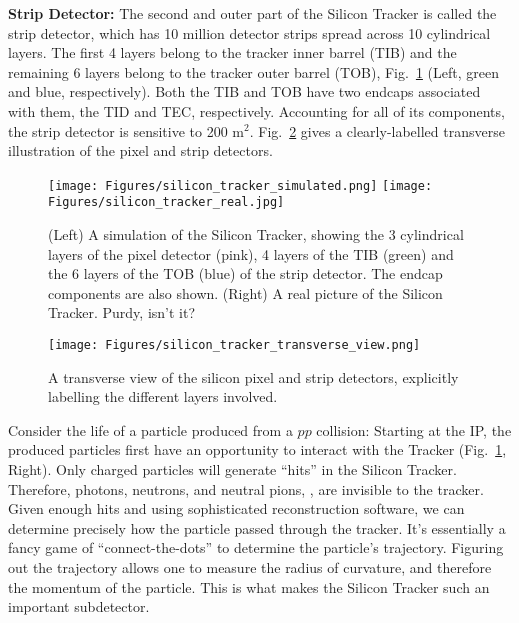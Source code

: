{\bf Strip Detector:} The second and outer part of the Silicon Tracker is called the strip detector, which has 10 million detector strips spread across 10 cylindrical layers.
The first 4 layers belong to the tracker inner barrel (TIB) and the remaining 6 layers belong to the tracker outer barrel (TOB), Fig.~\ref{fig:tracker_real} (Left, green and blue, respectively). 
Both the TIB and TOB have two endcaps associated with them, the TID and TEC, respectively.
Accounting for all of its components, the strip detector is sensitive to 200 m$^2$.
Fig.~\ref{fig:tracker_xs} gives a clearly-labelled transverse illustration of the pixel and strip detectors.
\begin{figure}[pbth]
\centering
\texttt{[image: Figures/silicon\_tracker\_simulated.png]}
\texttt{[image: Figures/silicon\_tracker\_real.jpg]}
    \caption{
    (Left) A simulation of the Silicon Tracker, showing the 3 cylindrical layers of the pixel detector (pink), 4 layers of the TIB (green) and the 6 layers of the TOB (blue) of the strip detector.
    The endcap components are also shown.
    (Right) A real picture of the Silicon Tracker. Purdy, isn't it?} 
    \label{fig:tracker_real}
\end{figure}
\begin{figure}[pbth]
\centering
\texttt{[image: Figures/silicon\_tracker\_transverse\_view.png]}
    \caption{A transverse view of the silicon pixel and strip detectors, explicitly labelling the different layers involved.}
    \label{fig:tracker_xs}
\end{figure}

Consider the life of a particle produced from a $pp$ collision:
Starting at the IP, the produced particles first have an opportunity to interact with the Tracker (Fig.~\ref{fig:tracker_real}, Right).
Only charged particles will generate ``hits'' in the Silicon Tracker.
Therefore, photons, neutrons, and neutral pions, \eg, are invisible to the tracker.
Given enough hits and using sophisticated reconstruction software, we can determine precisely how the particle passed through the tracker.
It's essentially a fancy game of ``connect-the-dots'' to determine the particle's trajectory.
Figuring out the trajectory allows one to measure the radius of curvature, and therefore the momentum of the particle.
This is what makes the Silicon Tracker such an important subdetector.

